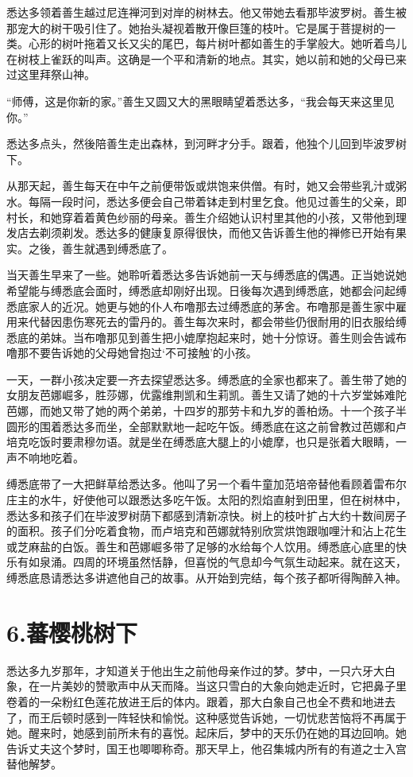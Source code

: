 \documentclass[12pt,twoside,openany]{book}
\begin{document}
悉达多领着善生越过尼连禅河到对岸的树林去。他又带她去看那毕波罗树。善生被那宠大的树干吸引住了。她抬头凝视着散开像巨篷的枝叶。它是属于菩提树的一类。心形的树叶拖着又长又尖的尾巴，每片树叶都如善生的手掌般大。她听着鸟儿在树枝上雀跃的叫声。这确是一个平和清新的地点。其实，她以前和她的父母已来过这里拜祭山神。

“师傅，这是你新的家。”善生又圆又大的黑眼睛望着悉达多，“我会每天来这里见你。”

悉达多点头，然後陪善生走出森林，到河畔才分手。跟着，他独个儿回到毕波罗树下。

从那天起，善生每天在中午之前便带饭或烘饱来供僧。有时，她又会带些乳汁或粥水。每隔一段时问，悉达多便会自己带着钵走到村里乞食。他见过善生的父亲，即村长，和她穿着着黄色纱丽的母亲。善生介绍她认识村里其他的小孩，又带他到理发店去剃须剃发。悉达多的健康复原得很快，而他又告诉善生他的禅修已开始有果实。之後，善生就遇到缚悉底了。

当天善生早来了一些。她聆听着悉达多告诉她前一天与缚悉底的偶遇。正当她说她希望能与缚悉底会面时，缚悉底却刚好出现。日後每次遇到缚悉底，她都会问起缚悉底家人的近况。她更与她的仆人布噜那去过缚悉底的茅舍。布噜那是善生家中雇用来代替因患伤寒死去的雷丹的。善生每次来时，都会带些仍很耐用的旧衣服给缚悉底的弟妹。当布噜那见到善生把小媲摩抱起来时，她十分惊讶。善生则会告诚布噜那不要告诉她的父母她曾抱过‘不可接触’的小孩。

一天，一群小孩决定要一齐去探望悉达多。缚悉底的全家也都来了。善生带了她的女朋友芭娜崛多，胜莎娜，优露维荆凯和生莉凯。善生又请了她的十六岁堂姊难陀芭娜，而她又带了她的两个弟弟，十四岁的那劳卡和九岁的善柏炀。十一个孩子半圆形的围着悉达多而坐，全部默默地一起吃午饭。缚悉底在这之前曾教过芭娜和卢培克吃饭时要肃穆勿语。就是坐在缚悉底大腿上的小媲摩，也只是张着大眼睛，一声不响地吃着。

缚悉底带了一大把鲜草给悉达多。他叫了另一个看牛童加范培帝替他看顾着雷布尔庄主的水牛，好使他可以跟悉达多吃午饭。太阳的烈焰直射到田里，但在树林中，悉达多和孩子们在毕波罗树荫下都感到清新凉快。树上的枝叶扩占大约十数间房子的面积。孩子们分吃着食物，而卢培克和芭娜就特别欣赏烘饱跟咖哩汁和沾上花生或芝麻盐的白饭。善生和芭娜崛多带了足够的水给每个人饮用。缚悉底心底里的快乐有如泉涌。四周的环境虽然恬静，但喜悦的气息却今气氛生动起来。就在这天，缚悉底恳请悉达多讲遮他自己的故事。从开始到完结，每个孩子都听得陶醉入神。

\chapter{6.蕃樱桃树下}\label{ch6}

悉达多九岁那年，才知道关于他出生之前他母亲作过的梦。梦中，一只六牙大白象，在一片美妙的赞歌声中从天而降。当这只雪白的大象向她走近时，它把鼻子里卷着的一朵粉红色莲花放进王后的体内。跟着，那大白象自己也全不费和地进去了，而王后顿时感到一阵轻快和愉悦。这种感觉告诉她，一切忧悲苦恼将不再属于她。醒来时，她感到前所未有的喜悦。起床后，梦中的天乐仍在她的耳边回响。她告诉丈夫这个梦时，国王也唧唧称奇。那天早上，他召集城内所有的有道之士入宫替他解梦。
\end{document}
